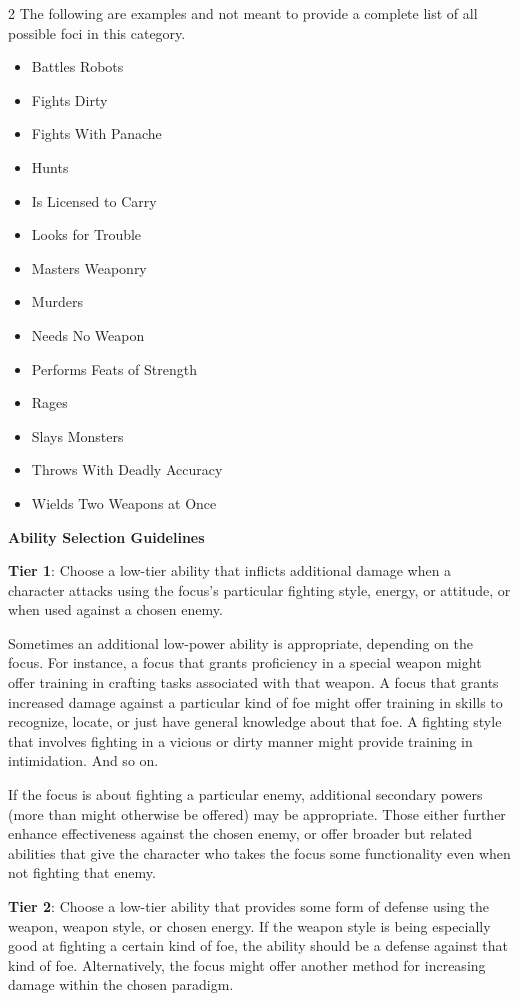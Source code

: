 \begin{multicols}{2}
The following are examples and not meant to provide a complete list of all possible foci in this category.

\begin{itemize} 
\item Battles Robots
\item Fights Dirty
\item Fights With Panache
\item Hunts
\item Is Licensed to Carry
\item Looks for Trouble
\item Masters Weaponry
\item Murders
\item Needs No Weapon
\item Performs Feats of Strength
\item Rages
\item Slays Monsters
\item Throws With Deadly Accuracy
\item Wields Two Weapons at Once
\end{itemize}

\textbf{Ability Selection Guidelines}

\textbf{Tier 1}: Choose a low-tier ability that inflicts additional damage when a character attacks using the focus’s particular fighting style, energy, or attitude, or when used against a chosen enemy.

Sometimes an additional low-power ability is appropriate, depending on the focus. For instance, a focus that grants proficiency in a special weapon might offer training in crafting tasks associated with that weapon. A focus that grants increased damage against a particular kind of foe might offer training in skills to recognize, locate, or just have general knowledge about that foe. A fighting style that involves fighting in a vicious or dirty manner might provide training in intimidation. And so on.

If the focus is about fighting a particular enemy, additional secondary powers (more than might otherwise be offered) may be appropriate. Those either further enhance effectiveness against the chosen enemy, or offer broader but related abilities that give the character who takes the focus some functionality even when not fighting that enemy.

\textbf{Tier 2}: Choose a low-tier ability that provides some form of defense using the weapon, weapon style, or chosen energy. If the weapon style is being especially good at fighting a certain kind of foe, the ability should be a defense against that kind of foe. Alternatively, the focus might offer another method for increasing damage within the chosen paradigm.


\end{multicols}
